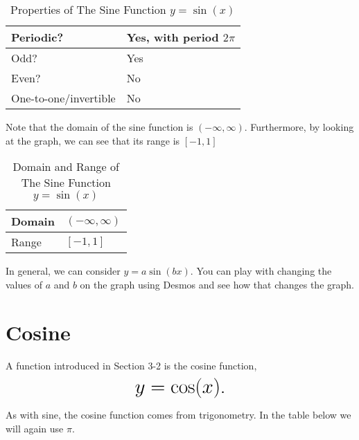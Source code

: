 \documentclass[nooutcomes]{ximera}
\begin{document}
\begin{table}[h]
\caption{\label{tab:sineproperties}Properties of The Sine Function $y = \sin(x)$}
\centering
\begin{tabular}{l|l}
Periodic? & Yes, with period $2\pi$ \\ \hline
Odd? &  Yes \\ \hline
Even? & No \\ \hline
One-to-one/invertible & No
\end{tabular}
\end{table}

Note that the domain of the sine function is $(-\infty, \infty)$. Furthermore, by looking at the graph, we can see that its range is $[-1, 1]$

\begin{table}[h]
\caption{\label{tab:sinedr}Domain and Range of The Sine Function $y = \sin(x)$}
\centering
\begin{tabular}{l|l}
Domain & $(-\infty, \infty)$ \\ \hline
Range & $[-1, 1]$
\end{tabular}
\end{table}

In general, we can consider $y=a\sin(bx)$.  You can play with changing the values of $a$ and $b$ on the graph using Desmos and see how that changes the graph.  

\begin{center}  
\end{center}



\newpage


\section{Cosine}
A function introduced in Section 3-2 is the cosine function, $$ \mbox{\huge $y=\cos(x)$.}$$ 


As with sine, the cosine function comes from trigonometry. In the table below we will again use $\pi$.

\begin{image}
\end{image}
\end{document}
